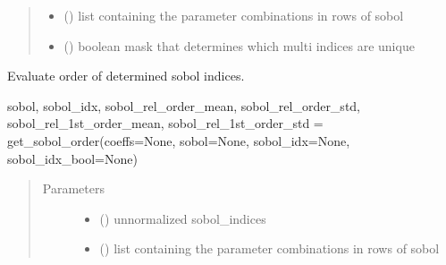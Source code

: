 \documentclass[letterpaper,10pt,english,openany,oneside]{sphinxmanual}
\begin{document}
\begin{fulllineitems}
\begin{fulllineitems}
\begin{quote}
\begin{description}
\begin{itemize}
\item {} 
 () \textendash{} list containing the parameter combinations in rows of sobol

\item {} 
 () \textendash{} boolean mask that determines which multi indices are unique

\end{itemize}


\end{description}\end{quote}

\end{fulllineitems}


\begin{fulllineitems}
\label{\detokenize{pygpc:pygpc.gpc.gPC.get_sobol_composition}}
Evaluate order of determined sobol indices.

sobol, sobol\_idx, sobol\_rel\_order\_mean, sobol\_rel\_order\_std, sobol\_rel\_1st\_order\_mean, sobol\_rel\_1st\_order\_std
= get\_sobol\_order(coeffs=None, sobol=None, sobol\_idx=None, sobol\_idx\_bool=None)
\begin{quote}\begin{description}
\item[{Parameters}] \leavevmode\begin{itemize}
\item {} 
 (\sphinxstyleliteralemphasis{\sphinxupquote{{[}}}\sphinxstyleliteralemphasis{\sphinxupquote{{]} }}) \textendash{} unnormalized sobol\_indices

\item {} 
 (\sphinxstyleliteralemphasis{\sphinxupquote{ {[}}}\sphinxstyleliteralemphasis{\sphinxupquote{{]} }}) \textendash{} list containing the parameter combinations in rows of sobol


\end{itemize}
\end{description}
\end{quote}
\end{fulllineitems}
\end{fulllineitems}
\end{document}
